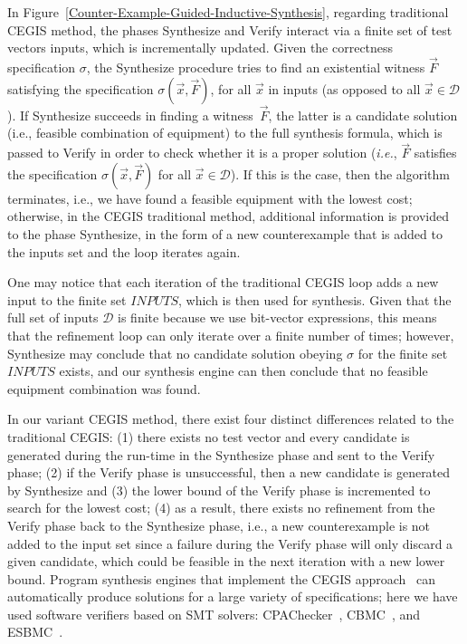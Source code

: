 \documentclass[runningheads]{llncs}
\begin{document}
In Figure~\ref{Counter-Example-Guided-Inductive-Synthesis}, regarding traditional CEGIS method, the phases {\sc Synthesize} and {\sc Verify} interact via a finite set of test vectors {\sc inputs}, which is incrementally updated. Given the correctness specification $\sigma$, the {\sc Synthesize} procedure tries to find an existential witness $\vec{F}$ satisfying the specification $\sigma(\vec{x}, \vec{F})$, for all $\vec{x}$ in {\sc inputs} (as opposed to all $\vec{x} \in \mathcal{D}$). If {\sc Synthesize} succeeds in finding a witness~$\vec{F}$, the latter is a candidate solution (i.e., feasible combination of equipment) to the full synthesis formula, which is passed to {\sc Verify} in order to check whether it is a proper solution ({\it i.e.}, $\vec{F}$ satisfies the specification $\sigma(\vec{x}, \vec{F})$ for all $\vec{x}\in\mathcal{D}$). If this is the case, then the algorithm terminates, i.e., we have found a feasible equipment with the lowest cost; otherwise, in the CEGIS traditional method, additional information is provided to the phase {\sc Synthesize}, in the form of a new counterexample that is added to the {\sc inputs} set and the loop iterates again.

One may notice that each iteration of the traditional CEGIS loop adds a new input to the finite set $INPUTS$, which is then used for synthesis. Given that the full set of inputs $\mathcal{D}$ is finite because we use bit-vector expressions, this means that the refinement loop can only iterate over a finite number of times; however, {\sc Synthesize} may conclude that no candidate solution obeying $\sigma$ for the finite set $INPUTS$ exists, and our synthesis engine can then conclude that no feasible equipment combination was found.

In our variant CEGIS method, there exist four distinct differences related to the traditional CEGIS: 
(1) there exists no test vector and every candidate is generated during the run-time in the {\sc Synthesize} phase and sent to the {\sc Verify} phase; 
(2) if the {\sc Verify} phase is unsuccessful, then a new candidate is generated by {\sc Synthesize} and 
(3) the lower bound of the {\sc Verify} phase is incremented to search for the lowest cost; 
(4) as a result, there exists no refinement from the {\sc Verify} phase back to the {\sc Synthesize} phase, i.e., 
a new counterexample is not added to the {\sc input} set since a failure during the {\sc Verify} phase will only discard a given candidate, which could be feasible in the next iteration with a new lower bound.
%
Program synthesis engines that implement the CEGIS approach~\cite{sketch} can automatically produce solutions for a large variety of specifications; %
here we have used software verifiers based on SMT solvers: %
CPAChecker~\cite{Beyer2011}, CBMC~\cite{Kroening}, and ESBMC~\cite{esbmc2018}.
\end{document}
